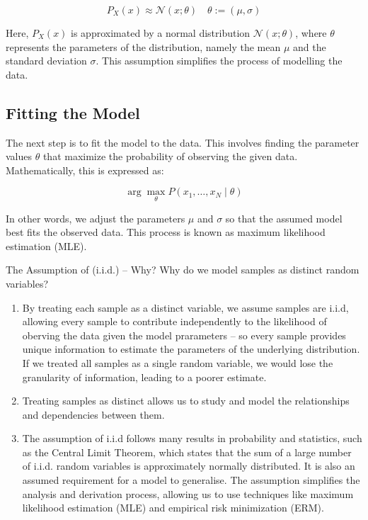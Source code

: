\[
P_X(x) \approx \mathcal{N}(x; \theta) \quad \theta := (\mu, \sigma)
\]

Here, \(P_X(x)\) is approximated by a normal distribution \(\mathcal{N}(x; \theta)\), where \(\theta\) represents the parameters of the distribution, namely the mean \(\mu\) and the standard deviation \(\sigma\). This assumption simplifies the process of modelling the data.

\subsection{Fitting the Model}

The next step is to fit the model to the data. This involves finding the parameter values \(\theta\) that maximize the probability of observing the given data. Mathematically, this is expressed as:

\[
\arg \max_{\theta} P(x_1, \ldots, x_N \mid \theta)
\]

In other words, we adjust the parameters \(\mu\) and \(\sigma\) so that the assumed model best fits the observed data. This process is known as maximum likelihood estimation (MLE).\\


\begin{commentbox}{The Assumption of (i.i.d.) – Why?}
    Why do we model samples as distinct random variables?

\begin{enumerate}
    \item By treating each sample as a distinct variable, we assume samples are i.i.d, allowing every sample to contribute independently to the likelihood of oberving the data given the model prarameters – so every sample provides unique information to estimate the parameters of the underlying distribution. If we treated all samples as a single random variable, we would lose the granularity of information, leading to a poorer estimate.
    \item Treating samples as distinct allows us to study and model the relationships and dependencies between them.
    \item The assumption of i.i.d follows many results in probability and statistics, such as the Central Limit Theorem, which states that the sum of a large number of i.i.d. random variables is approximately normally distributed. It is also an assumed requirement for a model to generalise. The assumption simplifies the analysis and derivation process, allowing us to use techniques like maximum likelihood estimation (MLE) and empirical risk minimization (ERM).
\end{enumerate}
    
\end{commentbox}

